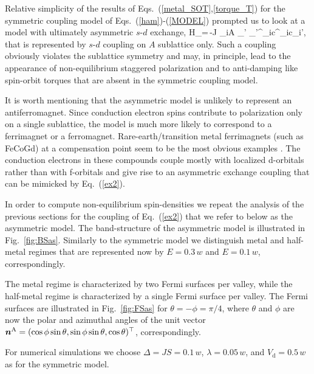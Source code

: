 Relative simplicity of the results of Eqs.~(\ref{metal_SOT},\ref{torque_T}) for the symmetric coupling model of Eqs.~(\ref{ham})-(\ref{MODEL}) prompted us to look at a model with ultimately asymmetric $s$-$d$ exchange,
\be
H_=\,-J \s_{i\in A }  \s_{\sigma\sigma'} \bb{\sigma}_{\sigma\sigma'}^_i\cdot c^\dagger_{i\sigma}c\0_{i\sigma'},
\label{ex2}
\e
that is represented by $s$-$d$ coupling on $A$ sublattice only. Such a coupling obviously violates the sublattice symmetry and may, in principle, lead to the appearance of non-equilibrium staggered polarization and to anti-damping like spin-orbit torques that are absent in the symmetric coupling model. 

It is worth mentioning that the asymmetric model is unlikely to represent an antiferromagnet. Since conduction electron spins contribute to polarization only on a single sublattice, the model is much more likely to correspond to a ferrimagnet or a ferromagnet.  Rare-earth/transition metal ferrimagnets (such as FeCoGd) at a compensation point seem to be the most obvious examples \cite{Hoffman2018}. The conduction electrons in these compounds couple mostly with localized d-orbitals rather than with f-orbitals and give rise to an asymmetric exchange coupling that can be mimicked by Eq.~(\ref{ex2}). 

In order to compute non-equilibrium spin-densities we repeat the analysis of the previous sections for the coupling of Eq.~(\ref{ex2}) that we refer to below as the asymmetric model. The band-structure of the asymmetric model is illustrated in Fig.~\ref{fig:BSas}. Similarly to the symmetric model we distinguish metal and half-metal regimes that are represented now by $E=0.3\,w$ and $E=0.1\,w$, correspondingly. 

The metal regime is characterized by two Fermi surfaces per valley, while the half-metal regime is characterized by a single Fermi surface per valley. The Fermi surfaces are illustrated in Fig.~\ref{fig:FSas} for $\theta=-\phi=\pi/4$, where $\theta$ and $\phi$ are now the polar and azimuthal angles of the unit vector $\boldsymbol{n}^\text{A}=(\cos\phi\sin\theta,\sin\phi\sin\theta,\cos\theta)^\top$, correspondingly. 

For numerical simulations we choose $\Delta= J S=0.1\,w$, $\lambda=0.05\,w$, and $V_\text{d}=0.5\,w$ as for the symmetric model. 

